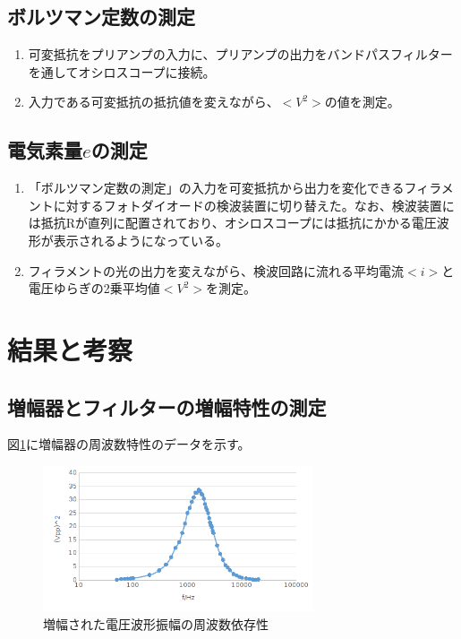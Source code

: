 \documentclass[11pt,a4j]{jsarticle}
\begin{document}
   \subsection{ボルツマン定数の測定}
   
   \begin{enumerate}
   \item 可変抵抗をプリアンプの入力に、プリアンプの出力をバンドパスフィルターを通してオシロスコープに接続。
   \item 入力である可変抵抗の抵抗値を変えながら、$<V^2>$の値を測定。
   \end{enumerate}
   
   \subsection{電気素量$e$の測定}
   
   \begin{enumerate}
   \item 「ボルツマン定数の測定」の入力を可変抵抗から出力を変化できるフィラメントに対するフォトダイオードの検波装置に切り替えた。なお、検波装置には抵抗Rが直列に配置されており、オシロスコープには抵抗にかかる電圧波形が表示されるようになっている。
   \item フィラメントの光の出力を変えながら、検波回路に流れる平均電流$<i>$と電圧ゆらぎの2乗平均値$<V^2>$を測定。
   \end{enumerate}
   
  
  
  
 \section{結果と考察}
   \subsection{増幅器とフィルターの増幅特性の測定}
   
   図\ref{fig:1_f-v}に増幅器の周波数特性のデータを示す。
   
   \begin{figure}[htbp]
  \centering
  \includegraphics[width=8cm,clip]{1_f-v.png}
  \caption{増幅された電圧波形振幅の周波数依存性}
  \label{fig:1_f-v}
 \end{figure}%
   
\end{document}
